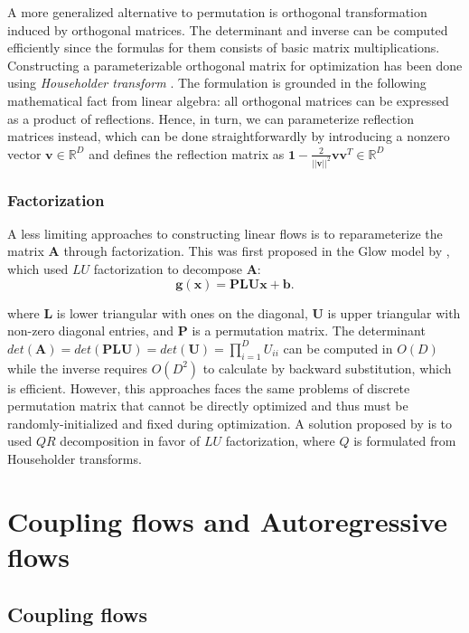 A more generalized alternative to permutation is orthogonal transformation
induced by orthogonal matrices. The determinant and inverse can be computed
efficiently since the formulas for them consists of basic matrix
multiplications. Constructing a parameterizable orthogonal matrix for
optimization has been done using \textit{Householder transform}
\cite{tomczakImprovingVariationalAutoEncoders2017}. The formulation is grounded
in the following mathematical fact from linear algebra: all orthogonal matrices
can be expressed as a product of reflections. Hence, in turn, we can
parameterize reflection matrices instead, which can be done straightforwardly by
introducing a nonzero vector $\mathbf{v} \in  \mathbb{R}^D$ and defines the
reflection matrix as $\mathbf{1} -
\frac{2}{||\mathbf{v}||^2}\mathbf{v}\mathbf{v}^T \in \mathbb{R}^D$

\subsubsection{Factorization}

A less limiting approaches to constructing linear flows is to reparameterize
the matrix $\mathbf{A}$ through factorization. This was first proposed in the
Glow model by \cite{kingmaGlowGenerativeFlow2018}, which used $LU$
factorization to decompose $\mathbf{A}$:
$$
\mathbf{g(x)} = \mathbf{PLUx} + \mathbf{b}
.$$

where $\mathbf{L}$ is lower triangular with ones on the diagonal, $\mathbf{U}$
is upper triangular with non-zero diagonal entries, and $\mathbf{P}$ is a
permutation matrix. The determinant $det(\mathbf{A}) = det(\mathbf{PLU}) =
det(\mathbf{U}) = \prod_{i=1}^D U_{ii}$ can be computed in $O(D)$ while the
inverse requires $O(D^2)$ to calculate by backward substitution, which is
efficient. However, this approaches faces the same problems of discrete
permutation matrix that cannot be directly optimized and thus must be
randomly-initialized and fixed during optimization. A solution proposed by
\cite{hoogeboomEmergingConvolutionsGenerative2019} is to used $QR$ decomposition
in favor of $LU$ factorization, where $Q$ is formulated from Householder
transforms.

\section{Coupling flows and Autoregressive flows}
\subsection{Coupling flows}
